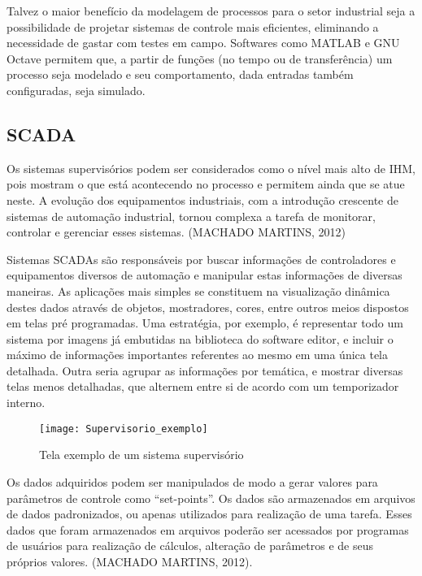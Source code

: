Talvez o maior benefício da modelagem de processos para o setor industrial seja a possibilidade de projetar sistemas de controle mais eficientes, eliminando a necessidade de gastar com testes em campo. Softwares como MATLAB e GNU Octave permitem que, a partir de funções (no tempo ou de transferência) um processo seja modelado e seu comportamento, dada entradas também configuradas, seja simulado.

\subsection{SCADA}

Os sistemas supervisórios podem ser considerados como o nível mais alto de IHM, pois mostram o que está acontecendo no processo e permitem ainda que se atue neste. A evolução dos equipamentos industriais, com a introdução crescente de sistemas de automação industrial, tornou complexa a tarefa de monitorar, controlar e gerenciar esses sistemas. (MACHADO MARTINS, 2012)

Sistemas SCADAs são responsáveis por buscar informações de controladores e equipamentos diversos de automação e manipular estas informações de diversas maneiras. As aplicações mais simples se constituem na visualização dinâmica destes dados através de objetos, mostradores, cores, entre outros meios dispostos em telas pré programadas. Uma estratégia, por exemplo, é representar todo um sistema por imagens já embutidas na biblioteca do software editor, e incluir o máximo de informações importantes referentes ao mesmo em uma única tela detalhada. Outra seria agrupar as informações por temática, e mostrar diversas telas menos detalhadas, que alternem entre si de acordo com um temporizador interno.

\begin{figure}
	\centering
	\texttt{[image: Supervisorio\_exemplo]}
	\caption[Fonte: https://www.agaads.com/service/scada-system/]{Tela exemplo de um sistema supervisório}
	\label{img_supervisorio_exemplo}
\end{figure}

Os dados adquiridos podem ser manipulados de modo a gerar valores para parâmetros de  controle  como “set-points”. Os  dados são  armazenados em  arquivos de dados padronizados, ou apenas utilizados para realização de uma tarefa. Esses dados que foram armazenados em arquivos poderão ser acessados por programas de usuários para realização de cálculos, alteração de parâmetros e de seus próprios valores. (MACHADO MARTINS, 2012).

